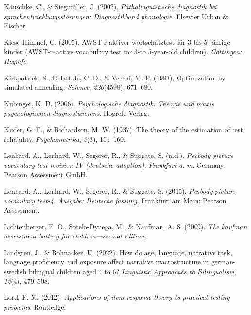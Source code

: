 \documentclass[
  man,floatsintext]{apa6}
\newlength{\cslhangindent}
\newlength{\cslentryspacingunit} %
\newenvironment{CSLReferences}[2] %
 {%
  \setlength{\parindent}{0pt}
  \ifodd #1
  \let\oldpar\par
  \def\par{\hangindent=\cslhangindent\oldpar}
  \fi
  \setlength{\parskip}{#2\cslentryspacingunit}
 }%
 {}
\begin{document}
\begin{CSLReferences}{1}{0}
\leavevmode{}%
Kauschke, C., \& Siegmüller, J. (2002). \emph{Patholinguistische diagnostik bei sprachentwicklungsst{ö}rungen: Diagnostikband phonologie}. Elsevier Urban \& Fischer.

\leavevmode{}%
Kiese-Himmel, C. (2005). AWST-r-aktiver wortschatztest f{ü}r 3-bis 5-j{ä}hrige kinder (AWST-r--active vocabulary test for 3-to 5-year-old children). \emph{G{ö}ttingen: Hogrefe}.

\leavevmode{}%
Kirkpatrick, S., Gelatt Jr, C. D., \& Vecchi, M. P. (1983). Optimization by simulated annealing. \emph{Science}, \emph{220}(4598), 671--680.

\leavevmode{}%
Kubinger, K. D. (2006). \emph{Psychologische diagnostik: Theorie und praxis psychologischen diagnostizierens}. Hogrefe Verlag.

\leavevmode{}%
Kuder, G. F., \& Richardson, M. W. (1937). The theory of the estimation of test reliability. \emph{Psychometrika}, \emph{2}(3), 151--160.

\leavevmode{}%
Lenhard, A., Lenhard, W., Segerer, R., \& Suggate, S. (n.d.). \emph{Peabody picture vocabulary test-revision IV (deutsche adaption). Frankfurt a. m}. Germany: Pearson Assessment GmbH.

\leavevmode{}%
Lenhard, A., Lenhard, W., Segerer, R., \& Suggate, S. (2015). \emph{Peabody picture vocabulary test-4. Ausgabe: Deutsche fassung}. Frankfurt am Main: Pearson Assessment.

\leavevmode{}%
Lichtenberger, E. O., Sotelo-Dynega, M., \& Kaufman, A. S. (2009). \emph{The kaufman assessment battery for children---second edition.}

\leavevmode{}%
Lindgren, J., \& Bohnacker, U. (2022). How do age, language, narrative task, language proficiency and exposure affect narrative macrostructure in german-swedish bilingual children aged 4 to 6? \emph{Linguistic Approaches to Bilingualism}, \emph{12}(4), 479--508.

\leavevmode{}%
Lord, F. M. (2012). \emph{Applications of item response theory to practical testing problems}. Routledge.


\end{CSLReferences}
\end{document}
